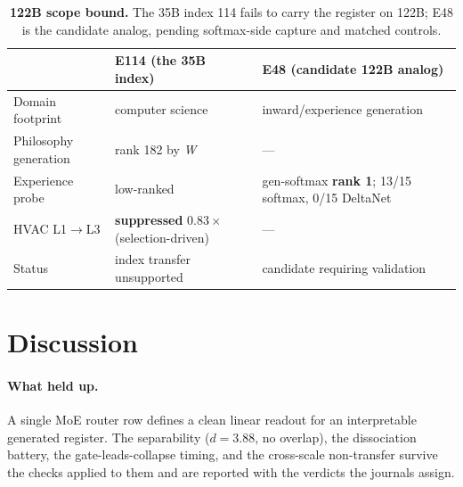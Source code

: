 \documentclass[10pt,a4paper,twocolumn]{article}
\newcommand{\W}{\textit{W}}
\begin{document}
\begin{table}[t]
\small
\centering
\begin{tabularx}{0.96\textwidth}{l X X}
\toprule
 & \textbf{E114 (the 35B index)} & \textbf{E48 (candidate 122B analog)} \\
\midrule
Domain footprint        & computer science                  & inward/experience generation \\
Philosophy generation   & rank 182 by \W{}                  & --- \\
Experience probe        & low-ranked                        & gen-softmax \textbf{rank 1}; 13/15 softmax, 0/15 DeltaNet \\
HVAC L1$\rightarrow$L3   & \textbf{suppressed} $0.83\times$ (selection-driven) & --- \\
Status                  & index transfer unsupported         & candidate requiring validation \\
\bottomrule
\end{tabularx}
\caption{\textbf{122B scope bound.} The 35B index 114 fails to carry the register
on 122B; E48 is the candidate analog, pending softmax-side capture and matched
controls.}
\label{tab:transfer}
\end{table}

\section{Discussion}\label{sec:disc}

\paragraph{What held up.}
A single MoE router row defines a clean linear readout for an interpretable generated
register. The separability ($d{=}3.88$, no overlap), the dissociation battery, the
gate-leads-collapse timing, and the cross-scale non-transfer survive the checks
applied to them and are reported with the verdicts the journals assign.
\end{document}
